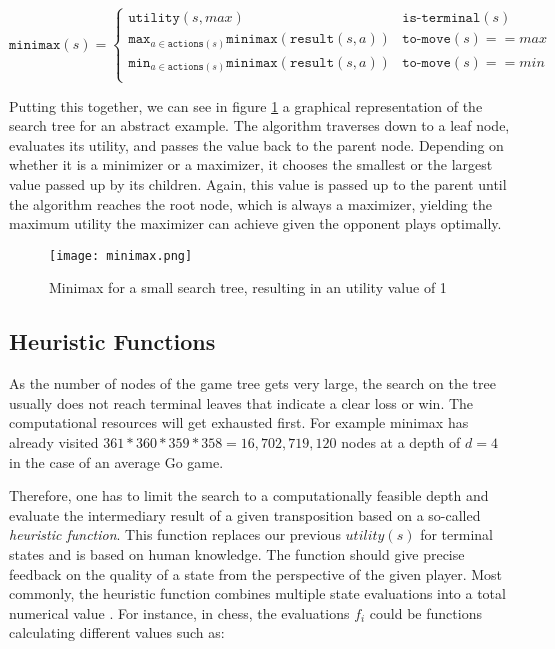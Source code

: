 \begin{equation}
    \texttt{minimax}(s) =
    \begin{cases}
        \texttt{utility}(s, max)                                                      & \texttt{is-terminal}(s)    \\
        \texttt{max}_{a\in\texttt{actions}(s)}\texttt{minimax}(\texttt{result}(s, a)) & \texttt{to-move}(s) == max \\
        \texttt{min}_{a\in\texttt{actions}(s)}\texttt{minimax}(\texttt{result}(s, a)) & \texttt{to-move}(s) == min \\
    \end{cases}
\end{equation}

Putting this together, we can see in figure \ref{minimax} a graphical representation of the search tree for an abstract example. The algorithm traverses down to a leaf node, evaluates its utility, and passes the value back to the parent node. Depending on whether it is a minimizer or a maximizer, it chooses the smallest or the largest value passed up by its children. Again, this value is passed up to the parent until the algorithm reaches the root node, which is always a maximizer, yielding the maximum utility the maximizer can achieve given the opponent plays optimally.

\begin{figure}
    \centering
    \texttt{[image: minimax.png]}
    \caption{Minimax for a small search tree, resulting in an utility value of 1 \cite[cf. p. 303]{russell_artificial_2021}}
    \label{minimax}
\end{figure}

\subsection{Heuristic Functions}
As the number of nodes of the game tree gets very large, the search on the tree usually does not reach terminal leaves that indicate a clear loss or win. The computational resources will get exhausted first. For example minimax has already visited $ 361 * 360 * 359 * 358 = 16,702,719,120 $ nodes at a depth of $ d = 4 $ in the case of an average Go game.

Therefore, one has to limit the search to a computationally feasible depth and evaluate the intermediary result of a given transposition based on a so-called \textit{heuristic function}. This function replaces our previous $ utility(s) $ for terminal states and is based on human knowledge. The function should give precise feedback on the quality of a state from the perspective of the given player. Most commonly, the heuristic function combines multiple state evaluations into a total numerical value \cite[cf. p. 316]{russell_artificial_2021}. For instance, in chess, the evaluations $ f_i $ could be functions calculating different values such as:

